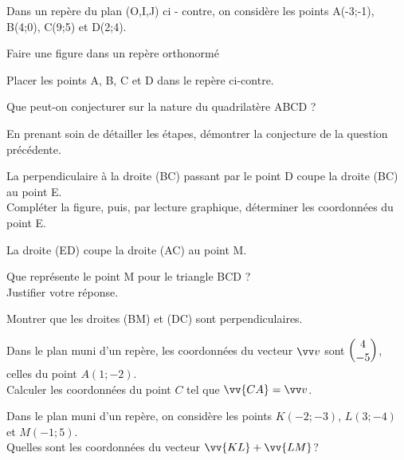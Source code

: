 \documentclass[11pt,a4paper]{article}  %
\begin{document}

Dans un repère du plan (O,I,J) ci - contre, on considère les points A(-3;-1), B(4;0), C(9;5) et D(2;4).


\begin{enumMet}
	\item Faire une figure dans un repère orthonormé\\
	\item Placer les points A, B, C et D dans le repère ci-contre.
	\item
	\begin{enumMet}
		\item Que peut-on conjecturer sur la nature du quadrilatère ABCD ?
		\item En prenant soin de détailler les étapes, démontrer la conjecture de la question précédente.
	\end{enumMet}
	\item La perpendiculaire à la droite (BC) passant par le point D coupe la droite (BC) au point E.\\
	Compléter la figure, puis, par lecture graphique, déterminer les coordonnées du point E.
	\item La droite (ED) coupe la droite (AC) au point M.
	\begin{enumMet} 
		\item Que représente le point M pour le triangle BCD ? \\Justifier votre réponse.
		\item Montrer que les droites (BM) et (DC) sont perpendiculaires.
	\end{enumMet}
\end{enumMet}


\begin{exercice}{}
	Dans le plan muni d'un repère, les coordonnées du vecteur $\vv v$ sont $\begin{pmatrix} 4\\ -5 \end{pmatrix}$, celles du point $A(1;-2)$.\\ Calculer les coordonnées du point $C$ tel que $\vv{CA}=\vv v$.
\end{exercice}

\begin{exercice}{}
	Dans le plan muni d'un repère, on considère les points $K(-2;-3)$, $L(3;-4)$ et $M(-1;5)$. \\ Quelles sont les coordonnées du vecteur $\vv{KL}+\vv{LM}$?\\
\end{exercice}
\end{document}
